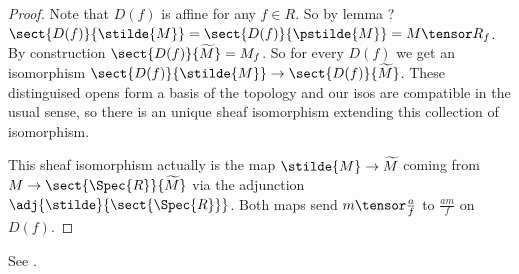 
\begin{proof}
Note that $D(f)$ is affine for any $f\in R$.
So by lemma ? $\sect{D(f)}{\stilde{M}}= \sect{D(f)}{\pstilde{M}} = M \tensor R_f$.
By construction $\sect{D(f)}{\widetilde{M}} = M_f$.
So for every $D(f)$ we get an isomorphism $\sect{D(f)}{\stilde{M}} \rightarrow \sect{D(f)}{\widetilde{M}}$. 
These distinguised opens form a basis of the topology and our isos are compatible in the usual sense, 
so there is an unique sheaf isomorphism extending this collection of isomorphism.

This sheaf isomorphism actually is the map $\stilde{M} \rightarrow \widetilde{M}$
coming from $M\rightarrow \sect{\Spec{R}}{\widetilde{M}}$
via the adjunction $\adj{\stilde}{\sect{\Spec{R}}}$.
Both maps send $m\tensor \frac{a}{f}$ to $\frac{am}{f}$ on $D(f)$.
\end{proof}

See \cite[Tag 01I7]{stacks}.

